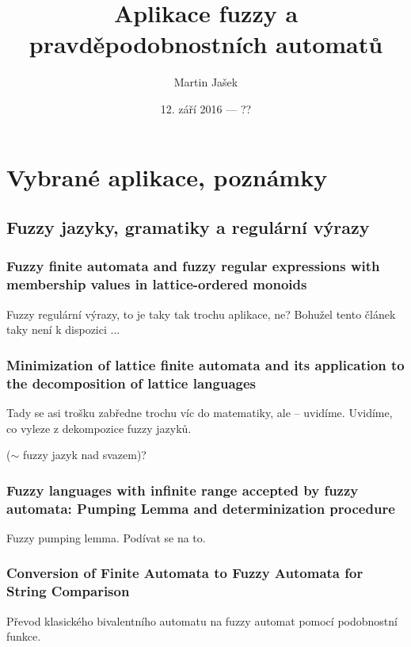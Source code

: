 \documentclass[a4paper,10pt]{article}
\title{Aplikace fuzzy a pravděpodobnostních automatů}
\author{Martin Jašek}
\date{12. září 2016 --- ??}
\begin{document}
\maketitle
\tableofcontents

\newpage

\section{Vybrané aplikace, poznámky}

\subsection{Fuzzy jazyky, gramatiky a regulární výrazy}


\subsubsection*{Fuzzy finite automata and fuzzy regular expressions with membership values in lattice-ordered monoids \cite{LiPed-FuzzFinAutFuzzRegExMembValLattOrdMon}}

Fuzzy regulární výrazy, to je taky tak trochu aplikace, ne? Bohužel tento článek taky není k dispozici ...


\subsubsection*{Minimization of lattice finite automata and its application to the decomposition of lattice languages \cite{LiPed-MinLattFinAutAppDecoLattLang}}

Tady se asi trošku zabředne trochu víc do matematiky, ale -- uvidíme. Uvidíme, co vyleze z dekompozice fuzzy jazyků.

\begin{definition}
  ($\sim$ fuzzy jazyk nad svazem)?
\end{definition}

\subsubsection*{Fuzzy languages with infinite range accepted by fuzzy automata: Pumping Lemma and determinization procedure \cite{GonGar-FuzzLangInfRanAccGuzzAutPumLemDetProc}}

Fuzzy pumping lemma. Podívat se na to.

\subsubsection*{Conversion of Finite Automata to Fuzzy Automata for String Comparison \cite{RamGir-ConvFinAutFuzzAutStrComp}}
Převod klasického bivalentního automatu na fuzzy automat pomocí podobnostní funkce.
\end{document}
